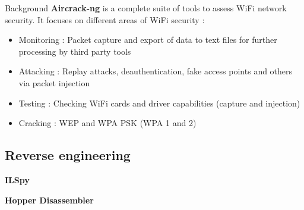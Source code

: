 \begin{chaptercover}{Background}
\textbf{Aircrack-ng} \cite{aircrack-ng} is a complete suite of tools to assess WiFi network security. It focuses on different areas of WiFi security :
\begin{itemize}
  \item Monitoring : Packet capture and export of data to text files for further processing by third party tools
  \item Attacking : Replay attacks, deauthentication, fake access points and others via packet injection
  \item Testing : Checking WiFi cards and driver capabilities (capture and injection)
  \item Cracking : WEP and WPA PSK (WPA 1 and 2)
\end{itemize}

\subsection{Reverse engineering}

\textbf{ILSpy}

\textbf{Hopper Disassembler}


\end{chaptercover}
